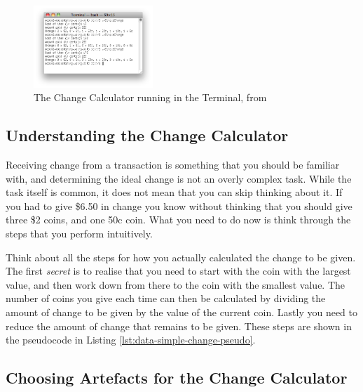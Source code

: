 \begin{figure}[h]
   \centering
   \includegraphics[width=0.4\textwidth]{./topics/storing-using-data/images/SimpleChange} 
   \caption{The Change Calculator running in the Terminal, from }
   \label{fig:storing-using-simeple-change-1}
\end{figure}



\clearpage
\subsection{Understanding the Change Calculator} %
\label{sub:understanding_simple_change}

Receiving change from a transaction is something that you should be familiar with, and determining the ideal change is not an overly complex task. While the task itself is common, it does not mean that you can skip thinking about it. If you had to give \$6.50 in change you know without thinking that you should give three \$2 coins, and one 50c coin. What you need to do now is think through the steps that you perform intuitively.

Think about all the steps for how you actually calculated the change to be given. The first \emph{secret} is to realise that you need to start with the coin with the largest value, and then work down from there to the coin with the smallest value. The number of coins you give each time can then be calculated by dividing the amount of change to be given by the value of the current coin. Lastly you need to reduce the amount of change that remains to be given. These steps are shown in the pseudocode in Listing \ref{lst:data-simple-change-pseudo}.


\clearpage
\subsection{Choosing Artefacts for the Change Calculator} %
\label{sub:choosing_artefacts_for_simple_change}

